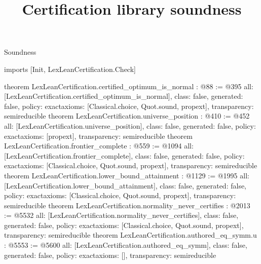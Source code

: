 \begin{lexlean}{Soundness}
\title{Certification library soundness}
\begin{coremodule}
imports [Init, LexLeanCertification.Check]

theorem LexLeanCertification.certified_optimum_is_normal : @88 := @395 {
  all: [LexLeanCertification.certified_optimum_is_normal],
  class: false,
  generated: false,
  policy: exact{axioms: [Classical.choice, Quot.sound, propext]},
  transparency: semireducible
}
theorem LexLeanCertification.universe_position : @410 := @452 {
  all: [LexLeanCertification.universe_position],
  class: false,
  generated: false,
  policy: exact{axioms: [propext]},
  transparency: semireducible
}
theorem LexLeanCertification.frontier_complete : @559 := @1094 {
  all: [LexLeanCertification.frontier_complete],
  class: false,
  generated: false,
  policy: exact{axioms: [Classical.choice, Quot.sound, propext]},
  transparency: semireducible
}
theorem LexLeanCertification.lower_bound_attainment : @1129 := @1995 {
  all: [LexLeanCertification.lower_bound_attainment],
  class: false,
  generated: false,
  policy: exact{axioms: [Classical.choice, Quot.sound, propext]},
  transparency: semireducible
}
theorem LexLeanCertification.normality_never_certifies : @2013 := @5532 {
  all: [LexLeanCertification.normality_never_certifies],
  class: false,
  generated: false,
  policy: exact{axioms: [Classical.choice, Quot.sound, propext]},
  transparency: semireducible
}
theorem LexLeanCertification.authored_eq_symm.{u} : @5553 := @5600 {
  all: [LexLeanCertification.authored_eq_symm],
  class: false,
  generated: false,
  policy: exact{axioms: []},
  transparency: semireducible
}


\end{coremodule}
\end{lexlean}
